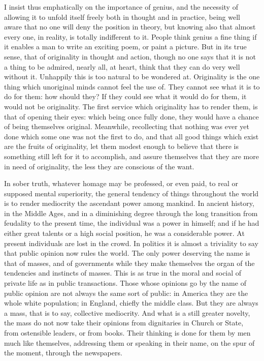 \documentclass[11pt,openany]{book}
\begin{document}
I insist thus emphatically on the importance of genius, and the necessity of allowing it to unfold itself freely both in thought and in practice, being well aware that no one will deny the position in theory, but knowing also that almost every one, in reality, is totally indifferent to it. People think genius a fine thing if it enables a man to write an exciting poem, or paint a picture. But in its true sense, that of originality in thought and action, though no one says that it is not a thing to be admired, nearly all, at heart, think that they can do very well without it. Unhappily this is too natural to be wondered at. Originality is the one thing which unoriginal minds cannot feel the use of. They cannot see what it is to do for them: how should they? If they could see what it would do for them, it would not be originality. The first service which originality has to render them, is that of opening their eyes: which being once fully done, they would have a chance of being themselves original. Meanwhile, recollecting that nothing was ever yet done which some one was not the first to do, and that all good things which exist are the fruits of originality, let them modest enough to believe that there is something still left for it to accomplish, and assure themselves that they are more in need of originality, the less they are conscious of the want.

In sober truth, whatever homage may be professed, or even paid, to real or supposed mental superiority, the general tendency of things throughout the world is to render mediocrity the ascendant power among mankind. In ancient history, in the Middle Ages, and in a diminishing degree through the long transition from feudality to the present time, the individual was a power in himself; and if he had either great talents or a high social position, he was a considerable power. At present individuals are lost in the crowd. In politics it is almost a triviality to say that public opinion now rules the world. The only power deserving the name is that of masses, and of governments while they make themselves the organ of the tendencies and instincts of masses. This is as true in the moral and social of private life as in public transactions. Those whose opinions go by the name of public opinion are not always the same sort of public: in America they are the whole white population; in England, chiefly the middle class. But they are always a mass, that is to say, collective mediocrity. And what is a still greater novelty, the mass do not now take their opinions from dignitaries in Church or State, from ostensible leaders, or from books. Their thinking is done for them by men much like themselves, addressing them or speaking in their name, on the spur of the moment, through the newspapers.
\end{document}
